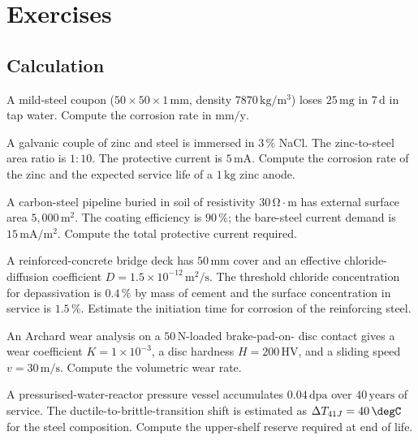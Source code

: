 \section{Exercises}

\subsection*{Calculation}

\begin{exercise}
A mild-steel coupon ($50 \times 50 \times 1\,\text{mm}$, density
$7870\,\text{kg}/\text{m}^3$) loses $25\,\text{mg}$ in $7\,\text{d}$
in tap water. Compute the corrosion rate in $\text{mm}/\text{y}$.
\end{exercise}

\begin{exercise}
A galvanic couple of zinc and steel is immersed in $3\,\%$ NaCl. The
zinc-to-steel area ratio is $1:10$. The protective current is
$5\,\text{mA}$. Compute the corrosion rate of the zinc and the
expected service life of a $1\,\text{kg}$ zinc anode.
\end{exercise}

\begin{exercise}
A carbon-steel pipeline buried in soil of resistivity $30\,\si{\ohm}
\cdot\text{m}$ has external surface area $5{,}000\,\text{m}^2$. The
coating efficiency is $90\,\%$; the bare-steel current demand is
$15\,\text{mA}/\text{m}^2$. Compute the total protective current
required.
\end{exercise}

\begin{exercise}
A reinforced-concrete bridge deck has $50\,\text{mm}$ cover and an
effective chloride-diffusion coefficient $D = 1.5 \times 10^{-12}\,
\text{m}^2/\text{s}$. The threshold chloride concentration for
depassivation is $0.4\,\%$ by mass of cement and the surface
concentration in service is $1.5\,\%$. Estimate the initiation time
for corrosion of the reinforcing steel.
\end{exercise}

\begin{exercise}
An Archard wear analysis on a $50\,\text{N}$-loaded brake-pad-on-
disc contact gives a wear coefficient $K = 1 \times 10^{-3}$, a disc
hardness $H = 200\,\text{HV}$, and a sliding speed $v = 30\,\text{m}/
\text{s}$. Compute the volumetric wear rate.
\end{exercise}

\begin{exercise}
A pressurised-water-reactor pressure vessel accumulates $0.04\,\text{dpa}$
over $40\,\text{years}$ of service. The ductile-to-brittle-transition
shift is estimated as $\Delta T_{41J} = 40\,\degC$ for the steel
composition. Compute the upper-shelf reserve required at end of life.
\end{exercise}


